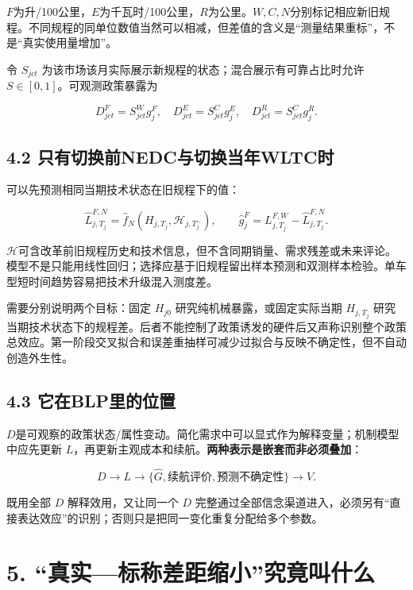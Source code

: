 \documentclass[
  11pt,
]{article}
\begin{document}
\(F\)为升/100公里，\(E\)为千瓦时/100公里，\(R\)为公里。\(W,C,N\)分别标记相应新旧规程。不同规程的同单位数值当然可以相减，但差值的含义是``测量结果重标''，不是``真实使用量增加''。

令 \(S_{jct}\)
为该市场该月实际展示新规程的状态；混合展示有可靠占比时允许
\(S\in[0,1]\)。可观测政策暴露为

\[
D_{jct}^F=S_{jct}^Wg_j^F,\quad
D_{jct}^E=S_{jct}^Cg_j^E,\quad
D_{jct}^R=S_{jct}^Cg_j^R. \tag{6}
\]

\subsection{4.2
只有切换前NEDC与切换当年WLTC时}\label{ux53eaux6709ux5207ux6362ux524dnedcux4e0eux5207ux6362ux5f53ux5e74wltcux65f6}

可以先预测相同当期技术状态在旧规程下的值：

\[
\widehat L_{j,T_j}^{F,N}
=\widehat f_N(H_{j,T_j},\mathcal H_{j,T_j^-}),
\qquad
\widehat g_j^F=L_{j,T_j}^{F,W}-\widehat L_{j,T_j}^{F,N}. \tag{7}
\]

\(\mathcal H\)可含改革前旧规程历史和技术信息，但不含同期销量、需求残差或未来评论。模型不是只能用线性回归；选择应基于旧规程留出样本预测和双测样本检验。单车型短时间趋势容易把技术升级混入测度差。

需要分别说明两个目标：固定 \(H_{j0}\) 研究纯机械暴露，或固定实际当期
\(H_{j,T_j}\)
研究当期技术状态下的规程差。后者不能控制了政策诱发的硬件后又声称识别整个政策总效应。第一阶段交叉拟合和误差重抽样可减少过拟合与反映不确定性，但不自动创造外生性。

\subsection{4.3
它在BLP里的位置}\label{ux5b83ux5728blpux91ccux7684ux4f4dux7f6e}

\(D\)是可观察的政策状态/属性变动。简化需求中可以显式作为解释变量；机制模型中应先更新
\(L\)，再更新主观成本和续航。\textbf{两种表示是嵌套而非必须叠加}：

\[
D\longrightarrow L\longrightarrow
\{\widehat G,\text{续航评价},\text{预测不确定性}\}
\longrightarrow V. \tag{8}
\]

既用全部 \(D\) 解释效用，又让同一个 \(D\)
完整通过全部信念渠道进入，必须另有``直接表达效应''的识别；否则只是把同一变化重复分配给多个参数。

\section{5.
``真实---标称差距缩小''究竟叫什么}\label{ux771fux5b9eux6807ux79f0ux5deeux8dddux7f29ux5c0fux7a76ux7adfux53ebux4ec0ux4e48}
\end{document}
